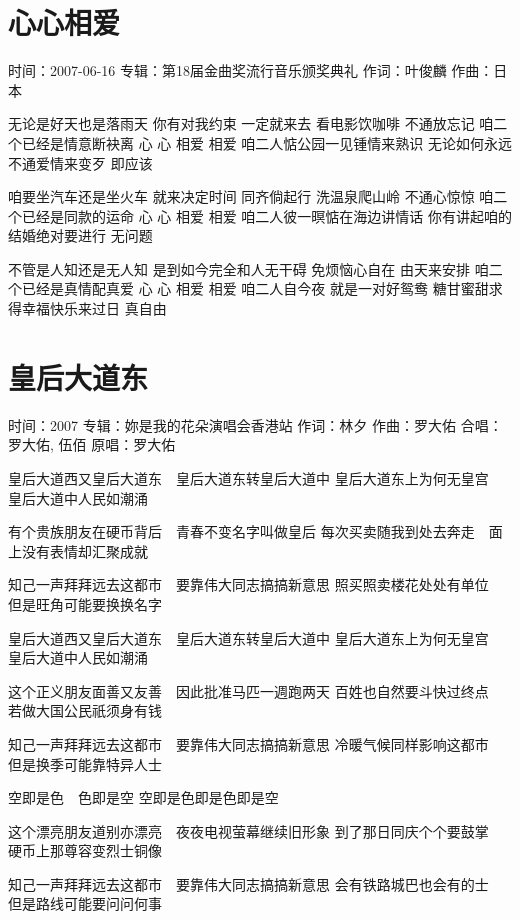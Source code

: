 \documentclass[UTF8,a4paper,oneside,twocolumn,12pt]{ctexbook}
\newcommand{\infopair}[2]{\textbullet #1：#2}
\newcommand{\zc}[1][伍佰]{\infopair{作词}{#1}}
\newcommand{\zq}[1][伍佰]{\infopair{作曲}{#1}}
\newcommand{\zj}[1]{\infopair{专辑}{#1}}
\newcommand{\yc}[1]{\infopair{原唱}{#1}}
\newcommand{\sj}[1]{\infopair{时间}{#1}}
\newenvironment{info}{\begin{flushleft}\kaishu
	}
	{\end{flushleft}\normalsize\yahei\par}
\newenvironment{lyric}{
	}
{}
\begin{document}
\section{心心相爱}%
\begin{info}
	\sj{2007-06-16}
	\zj{第18届金曲奖流行音乐颁奖典礼}
	\zc[叶俊麟]
	\zq[日本]
\end{info}
\begin{lyric} %
	无论是好天也是落雨天
	你有对我约束
	一定就来去
	看电影饮咖啡 不通放忘记
	咱二个已经是情意断袂离
	心 心 相爱 相爱
	咱二人惦公园一见锺情来熟识
	无论如何永远不通爱情来变歹
	即应该

	咱要坐汽车还是坐火车
	就来决定时间
	同齐倘起行
	洗温泉爬山岭 不通心惊惊
	咱二个已经是同款的运命
	心 心 相爱 相爱
	咱二人彼一暝惦在海边讲情话
	你有讲起咱的结婚绝对要进行
	无问题

	不管是人知还是无人知
	是到如今完全和人无干碍
	免烦恼心自在 由天来安排
	咱二个已经是真情配真爱
	心 心 相爱 相爱
	咱二人自今夜 就是一对好鸳鸯
	糖甘蜜甜求得幸福快乐来过日
	真自由
\end{lyric}

\section{皇后大道东}%
\begin{info}
	\sj{2007}
	\zj{妳是我的花朵演唱会香港站}
	\zc[林夕]
	\zq[罗大佑]
	\infopair{合唱}{罗大佑, 伍佰}
	\yc{罗大佑}
\end{info}
\begin{lyric}
	皇后大道西又皇后大道东　皇后大道东转皇后大道中
	皇后大道东上为何无皇宫　皇后大道中人民如潮涌

	有个贵族朋友在硬币背后　青春不变名字叫做皇后
	每次买卖随我到处去奔走　面上没有表情却汇聚成就

	知己一声拜拜远去这都市　要靠伟大同志搞搞新意思
	照买照卖楼花处处有单位　但是旺角可能要换换名字

	皇后大道西又皇后大道东　皇后大道东转皇后大道中
	皇后大道东上为何无皇宫　皇后大道中人民如潮涌

	这个正义朋友面善又友善　因此批准马匹一週跑两天
	百姓也自然要斗快过终点　若做大国公民祇须身有钱

	知己一声拜拜远去这都市　要靠伟大同志搞搞新意思
	冷暖气候同样影响这都市　但是换季可能靠特异人士

	空即是色　色即是空
	空即是色即是色即是空

	这个漂亮朋友道别亦漂亮　夜夜电视萤幕继续旧形象
	到了那日同庆个个要鼓掌　硬币上那尊容变烈士铜像

	知己一声拜拜远去这都市　要靠伟大同志搞搞新意思
	会有铁路城巴也会有的士　但是路线可能要问问何事
\end{lyric}
\end{document}
